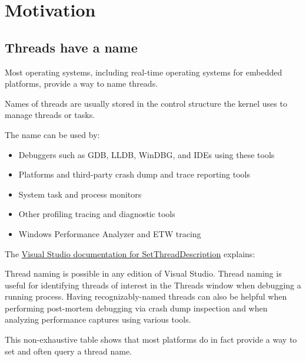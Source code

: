\documentclass{wg21}
\begin{document}
\section{Motivation}

\subsection{Threads have a name}

Most operating systems, including real-time operating systems for embedded platforms, provide a way to name threads.

Names of threads are usually stored in the control structure the kernel uses to manage threads or tasks.

The name can be used by:
\begin{itemize}
    \item Debuggers such as GDB, LLDB, WinDBG, and IDEs using these tools
    \item Platforms and third-party crash dump and trace reporting tools
    \item System task and process monitors
    \item Other profiling tracing and diagnostic tools
    \item Windows Performance Analyzer and ETW tracing
\end{itemize}

The \href{https://docs.microsoft.com/en-us/visualstudio/debugger/how-to-set-a-thread-name-in-native-code?view=vs-2019}{Visual Studio documentation for SetThreadDescription} explains:

\begin{quoteblock}
Thread naming is possible in any edition of Visual Studio. Thread naming is useful for identifying threads of interest in the Threads window when debugging a running process. Having recognizably-named threads can also be helpful when performing post-mortem debugging via crash dump inspection and when analyzing performance captures using various tools.
\end{quoteblock}

This non-exhaustive table shows that most platforms do in fact provide a way to set and often query a thread name.
\end{document}
